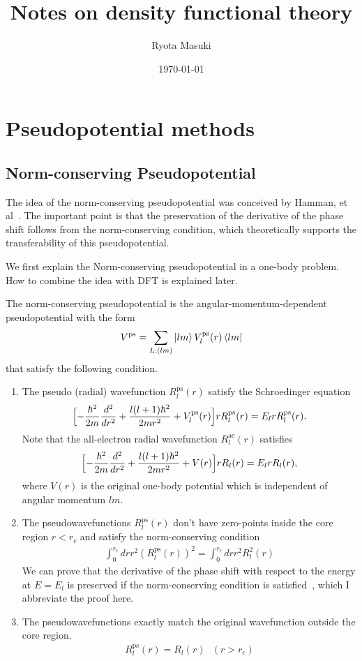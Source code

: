 \documentclass{article}
\title{Notes on density functional theory}
\author{Ryota Masuki}
\date{\today}
\begin{document}
\maketitle

\section{Pseudopotential methods}
\subsection{Norm-conserving Pseudopotential}
The idea of the norm-conserving pseudopotential was conceived by Hamman, et al~\cite{PhysRevLett.43.1494}.
The important point is that the preservation of the derivative of the phase shift follows from the norm-conserving condition,
which theoretically supports the transferability of this pseudopotential.

We first explain the Norm-conserving pseudopotential in a one-body problem.
How to combine the idea with DFT is explained later.

The norm-conserving pseudopotential is the angular-momentum-dependent pseudopotential with the form
\begin{align}
  V^{\text{ps}} = \sum_{L:(lm)} \ket{lm} V^{\text{ps}}_l(r) \bra{lm}
\end{align}
that satisfy the following condition.
\begin{enumerate}
  \item The pseudo (radial) wavefunction $R^{\text{ps}}_l(r)$ satisfy the Schroedinger equation
  \begin{align}
    \Bigl[
      - \frac{\hbar^2}{2m} \frac{d^2}{dr^2} + \frac{l(l+1)\hbar^2}{2mr^2} + V^{\text{ps}}_l(r)
    \Bigr] rR^{\text{ps}}_l(r) = E_l r R^{\text{ps}}_l(r).
  \end{align}
  Note that the all-electron radial wavefunction $R^{\text{ae}}_l(r)$ satisfies
  \begin{align}
    \Bigl[
      - \frac{\hbar^2}{2m} \frac{d^2}{dr^2} + \frac{l(l+1)\hbar^2}{2mr^2} + V(r)
    \Bigr] rR_l(r) = E_l r R_l(r),
  \end{align}
  where $V(r)$ is the original one-body potential which is independent of angular momentum $lm$.
  \item The pseudowavefunctions $R^{\text{ps}}_l(r)$ don't have zero-points inside the core region $r<r_c$ and satisfy the norm-conserving condition
  \begin{align}
    \int_0^{r_c} dr r^2 (R^{\text{ps}}_l(r))^2 = \int_0^{r_c} dr r^2 R_l^2(r)
  \end{align}
  We can prove that the derivative of the phase shift with respect to the energy at $E = E_l$ is preserved if the norm-conserving condition is satisfied~\cite{PhysRevLett.43.1494, Fujiwara_Kotaidenshikouzou}, which I abbreviate the proof here.
  \item The pseudowavefunctions exactly match the original wavefunction outside the core region.
  \begin{align}
   R^{\text{ps}}_l(r)= R_l(r) \text{\ }(r > r_c)
  \end{align}
\end{enumerate}
\end{document}
